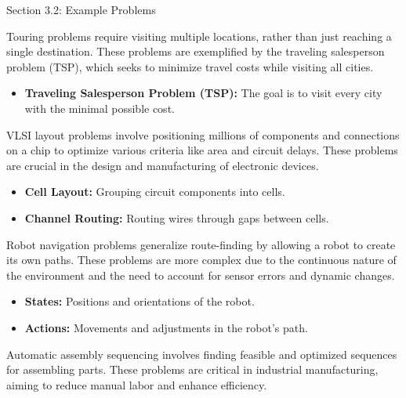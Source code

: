 \begin{notes}{Section 3.2: Example Problems}
    \begin{highlight}
        Touring problems require visiting multiple locations, rather than just reaching a single destination. These problems are exemplified by the traveling salesperson problem (TSP), which seeks 
        to minimize travel costs while visiting all cities.
    
        \begin{itemize}
            \item \textbf{Traveling Salesperson Problem (TSP):} The goal is to visit every city with the minimal possible cost.
        \end{itemize}
    \end{highlight}

    \begin{highlight}
        VLSI layout problems involve positioning millions of components and connections on a chip to optimize various criteria like area and circuit delays. These problems are crucial in the design 
        and manufacturing of electronic devices.
    
        \begin{itemize}
            \item \textbf{Cell Layout:} Grouping circuit components into cells.
            \item \textbf{Channel Routing:} Routing wires through gaps between cells.
        \end{itemize}
    \end{highlight}

    \begin{highlight}
        Robot navigation problems generalize route-finding by allowing a robot to create its own paths. These problems are more complex due to the continuous nature of the environment and the need 
        to account for sensor errors and dynamic changes.
    
        \begin{itemize}
            \item \textbf{States:} Positions and orientations of the robot.
            \item \textbf{Actions:} Movements and adjustments in the robot's path.
        \end{itemize}
    \end{highlight}

    \begin{highlight}
        Automatic assembly sequencing involves finding feasible and optimized sequences for assembling parts. These problems are critical in industrial manufacturing, aiming to reduce manual labor 
        and enhance efficiency.
    

\end{highlight}
\end{notes}
